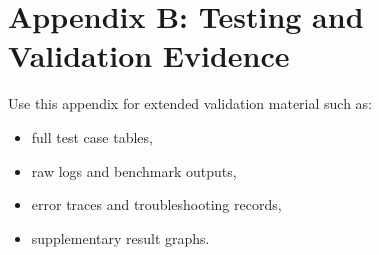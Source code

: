 \chapter{Appendix B: Testing and Validation Evidence}

Use this appendix for extended validation material such as:
\begin{itemize}
	\item full test case tables,
	\item raw logs and benchmark outputs,
	\item error traces and troubleshooting records,
	\item supplementary result graphs.
\end{itemize}
